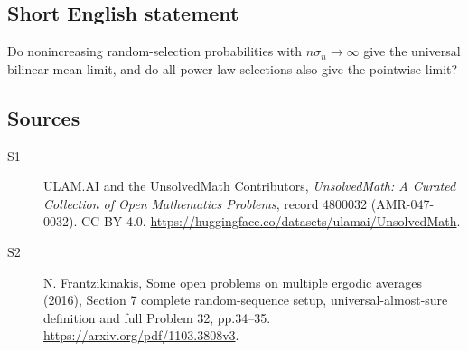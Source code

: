 \documentclass[11pt]{article}
\begin{document}
\subsection{Short English statement}
Do nonincreasing random-selection probabilities with $n\sigma_n\to\infty$ give the universal bilinear mean limit, and do all power-law selections also give the pointwise limit?
\subsection{Sources}
\begin{description}
\item[\hypertarget{source:4800032:1}{S1}] ULAM.AI and the UnsolvedMath Contributors, \emph{UnsolvedMath: A Curated Collection of Open Mathematics Problems}, record 4800032 (AMR-047-0032). CC BY 4.0. \url{https://huggingface.co/datasets/ulamai/UnsolvedMath}.
\item[\hypertarget{source:4800032:2}{S2}] N. Frantzikinakis, Some open problems on multiple ergodic averages (2016), Section 7 complete random-sequence setup, universal-almost-sure definition and full Problem 32, pp.34--35. \url{https://arxiv.org/pdf/1103.3808v3}.
\end{description}
\label{end:4800032}
\end{document}
